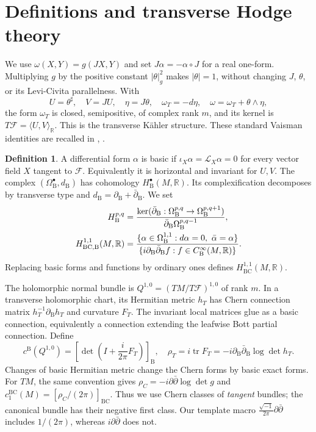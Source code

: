 \documentclass[12pt]{amsart}
\theoremstyle{definition}
\newtheorem{defn}[thm]{Definition}
\theoremstyle{remark}
\numberwithin{equation}{section}
\DeclareMathOperator{\tr}{tr}
\newcommand{\cF}{\mathcal{F}}
\newcommand{\cL}{\mathcal{L}}
\newcommand{\ddbar}{\frac{\sqrt{-1}}{2\pi} \partial \bar{\partial}}
\newcommand{\R}{\mathbb{R}}
\newcommand{\BC}{\mathrm{BC}}
\newcommand{\bas}{\mathrm{B}}
\newcommand{\wt}{\omega_{T}}
\newcommand{\rhoT}{\rho_{T}}
\newcommand{\rhoC}{\rho_{C}}
\begin{document}
\section{Definitions and transverse Hodge theory}\label{sec:defs}
We use $\omega(X,Y)=g(JX,Y)$ and set $J\alpha=-\alpha\circ J$ for a real
one-form. Multiplying $g$ by the positive constant $|\theta|_g^2$ makes
$|\theta|=1$, without changing $J$, $\theta$, or its Levi-Civita
parallelness. With
\begin{equation}\label{eq:vaisman}
U=\theta^\sharp,\quad V=JU,\quad\eta=J\theta,
\quad\wt=-d\eta,\quad \omega=\wt+\theta\wedge\eta,
\end{equation}
the form $\wt$ is closed, semipositive, of complex rank $m$, and its kernel
is $T\cF=\langle U,V\rangle_{\R}$. This is the transverse K\"ahler
structure. These standard Vaisman identities are recalled in
\cite[Section 2.1]{Istrati}, \cite[Theorem 2.2]{IO}.

\begin{defn}\label{def:basic}
A differential form $\alpha$ is basic if $\iota_X\alpha=\cL_X\alpha=0$
for every vector field $X$ tangent to $\cF$. Equivalently it is horizontal
and invariant for $U,V$. The complex $(\Omega_{\bas}^{\bullet},d_{\bas})$
has cohomology $H_{\bas}^{\bullet}(M,\R)$. Its complexification decomposes
by transverse type and $d_{\bas}=\partial_{\bas}+\bar\partial_{\bas}$.
We set
\begin{align}\label{eq:cohomdef}
H_{\bas}^{p,q}&=\frac{\ker(\bar\partial_{\bas}:\Omega_{\bas}^{p,q}
\to\Omega_{\bas}^{p,q+1})}{\bar\partial_{\bas}\Omega_{\bas}^{p,q-1}},\\
H_{\BC,\bas}^{1,1}(M,\R)&=
\frac{\{\alpha\in\Omega_{\bas}^{1,1}:d\alpha=0,\ \bar\alpha=\alpha\}}
{\{i\partial_{\bas}\bar\partial_{\bas}f:f\in C^\infty_{\bas}(M,\R)\}}.
\notag
\end{align}
Replacing basic forms and functions by ordinary ones defines
$H_{\BC}^{1,1}(M,\R)$.
\end{defn}

The holomorphic normal bundle is $Q^{1,0}=(TM/T\cF)^{1,0}$ of rank $m$.
In a transverse holomorphic chart, its Hermitian metric $h_T$ has Chern
connection matrix $h_T^{-1}\partial_{\bas}h_T$ and curvature $F_T$.
The invariant local matrices glue as a basic connection, equivalently a
connection extending the leafwise Bott partial connection. Define
\begin{equation}\label{eq:chern}
c^{\bas}(Q^{1,0})=
\left[\det\left(I+\frac{i}{2\pi}F_T\right)\right]_{\bas},
\quad \rhoT=i\tr F_T=-i\partial_{\bas}\bar\partial_{\bas}\log\det h_T.
\end{equation}
Changes of basic Hermitian metric change the Chern forms by basic exact
forms. For $TM$, the same convention gives
$\rhoC=-i\partial\bar\partial\log\det g$ and
$c_1^{\BC}(M)=[\rhoC/(2\pi)]_{\BC}$.
Thus we use Chern classes of \emph{tangent} bundles; the canonical bundle
has their negative first class. Our template macro
$\ddbar$ includes $1/(2\pi)$, whereas $i\partial\bar\partial$ does not.
\end{document}
